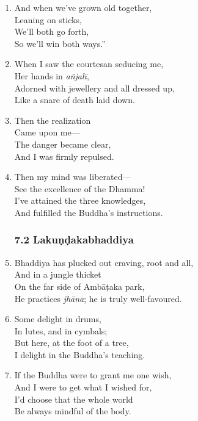 \documentclass[10pt, openany]{book}
\begin{document}
\begin{enumerate}
\item And when we’ve grown old together,\\
Leaning on sticks,\\
We’ll both go forth,\\
So we’ll win both ways.”

\item When I saw the courtesan seducing me,\\
Her hands in \emph{añjalī},\\
Adorned with jewellery and all dressed up,\\
Like a snare of death laid down.

\item Then the realization\\
Came upon me—\\
The danger became clear,\\
And I was firmly repulsed.

\item Then my mind was liberated—\\
See the excellence of the Dhamma!\\
I’ve attained the three knowledges,\\
And fulfilled the Buddha’s instructions.

\subsubsection*{7.2 Lakuṇḍakabhaddiya}

\item Bhaddiya has plucked out craving, root and all,\\
And in a jungle thicket\\
On the far side of Ambāṭaka park,\\
He practices \emph{jhāna}; he is truly well-favoured.

\item Some delight in drums,\\
In lutes, and in cymbals;\\
But here, at the foot of a tree,\\
I delight in the Buddha’s teaching.

\item If the Buddha were to grant me one wish,\\
And I were to get what I wished for,\\
I’d choose that the whole world\\
Be always mindful of the body.


\end{enumerate}
\end{document}
